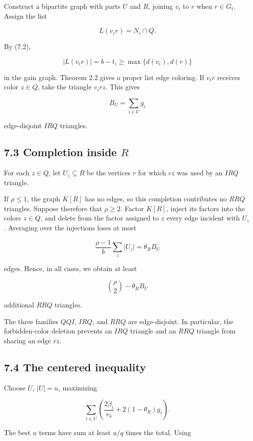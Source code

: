 \documentclass[11pt,a4paper]{article}
\begin{document}
Construct a bipartite graph with parts \(U\) and \(R\), joining \(v_i\) to \(r\) when \(r\in G_i\). Assign the list

\[
L(v_ir)=N_i\cap Q.
\]

By (7.2),

\[
|L(v_ir)|=b-t_i
\ge
\max\{d(v_i),d(r)\}
\]

in the gain graph. Theorem 2.2 gives a proper list edge coloring. If \(v_ir\) receives color \(z\in Q\), take the triangle \(v_irz\). This gives

\[
B_U=\sum_{i\in U}g_i
\]

edge-disjoint \(IRQ\) triangles.

\subsection{\texorpdfstring{7.3 Completion inside \(R\)}{7.3 Completion inside R}}\label{completion-inside-r}

For each \(z\in Q\), let \(U_z\subseteq R\) be the vertices \(r\) for which \(rz\) was used by an \(IRQ\) triangle.

If \(\rho\le1\), the graph \(K[R]\) has no edges, so this completion contributes no \(RRQ\) triangles. Suppose therefore that \(\rho\ge2\). Factor \(K[R]\), inject its factors into the colors \(z\in Q\), and delete from the factor assigned to \(z\) every edge incident with \(U_z\). Averaging over the injections loses at most

\[
\frac{\rho-1}{b}\sum_z|U_z|
=
\theta_RB_U
\]

edges. Hence, in all cases, we obtain at least

\[
\binom\rho2-\theta_RB_U
\]

additional \(RRQ\) triangles.

The three families \(QQI\), \(IRQ\), and \(RRQ\) are edge-disjoint. In particular, the forbidden-color deletion prevents an \(IRQ\) triangle and an \(RRQ\) triangle from sharing an edge \(rz\).

\subsection{7.4 The centered inequality}\label{the-centered-inequality}

Choose \(U\), \(|U|=u\), maximizing

\[
\sum_{i\in U}
\left(
\frac{2\beta_i}{r_b}+2(1-\theta_R)g_i
\right).
\]

The best \(u\) terms have sum at least \(u/q\) times the total. Using
\end{document}
